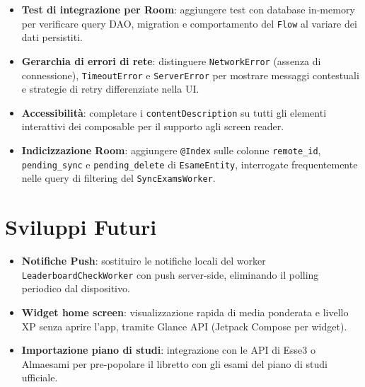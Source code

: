 \documentclass[a4paper,12pt]{report}
\begin{document}
    \begin{itemize}
        \item \textbf{Test di integrazione per Room}: aggiungere test con database
        in-memory per verificare query DAO, migration e comportamento del \texttt{Flow}
        al variare dei dati persistiti.
        \item \textbf{Gerarchia di errori di rete}: distinguere \texttt{NetworkError}
        (assenza di connessione), \texttt{TimeoutError} e \texttt{ServerError} per
        mostrare messaggi contestuali e strategie di retry differenziate nella UI.
        \item \textbf{Accessibilità}: completare i \texttt{contentDescription} su tutti
        gli elementi interattivi dei composable per il supporto agli screen reader.
        \item \textbf{Indicizzazione Room}: aggiungere \texttt{@Index} sulle colonne
        \texttt{remote\_id}, \texttt{pending\_sync} e \texttt{pending\_delete} di
        \texttt{EsameEntity}, interrogate frequentemente nelle query di filtering
        del \texttt{SyncExamsWorker}.
    \end{itemize}

    \section{Sviluppi Futuri}

    \begin{itemize}
        \item \textbf{Notifiche Push}: sostituire le notifiche locali del worker
        \texttt{LeaderboardCheckWorker} con push server-side,
        eliminando il polling periodico dal dispositivo.
        \item \textbf{Widget home screen}: visualizzazione rapida di media ponderata e
        livello XP senza aprire l'app, tramite Glance API (Jetpack Compose per widget).
        \item \textbf{Importazione piano di studi}: integrazione con le API di Esse3 o
        Almaesami per pre-popolare il libretto con gli esami del piano di studi ufficiale.
    \end{itemize}
\end{document}
